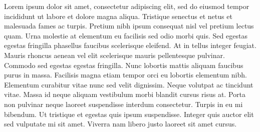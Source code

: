 
Lorem ipsum dolor sit amet, consectetur adipiscing elit, sed do eiusmod tempor incididunt ut labore et dolore magna aliqua. Tristique senectus et netus et malesuada fames ac turpis. Pretium nibh ipsum consequat nisl vel pretium lectus quam. Urna molestie at elementum eu facilisis sed odio morbi quis. Sed egestas egestas fringilla phasellus faucibus scelerisque eleifend. At in tellus integer feugiat. Mauris rhoncus aenean vel elit scelerisque mauris pellentesque pulvinar. Commodo sed egestas egestas fringilla. Nunc lobortis mattis aliquam faucibus purus in massa. Facilisis magna etiam tempor orci eu lobortis elementum nibh. Elementum curabitur vitae nunc sed velit dignissim. Neque volutpat ac tincidunt vitae. Massa id neque aliquam vestibulum morbi blandit cursus risus at. Porta non pulvinar neque laoreet suspendisse interdum consectetur. Turpis in eu mi bibendum. Ut tristique et egestas quis ipsum suspendisse. Integer quis auctor elit sed vulputate mi sit amet. Viverra nam libero justo laoreet sit amet cursus.

\vspace*{5\baselineskip}